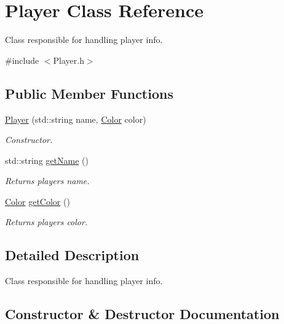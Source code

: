 \hypertarget{classPlayer}{}\section{Player Class Reference}
\label{classPlayer}


Class responsible for handling player info.  




{\ttfamily \#include $<$Player.\+h$>$}

\subsection*{Public Member Functions}
\begin{DoxyCompactItemize}
\item 
\hyperlink{classPlayer_a0e6411e555691354341782b0d6b1bc09}{Player} (std\+::string name, \hyperlink{Enums_8h_ab87bacfdad76e61b9412d7124be44c1c}{Color} color)
\begin{DoxyCompactList}\small\item\em Constructor. \end{DoxyCompactList}\item 
std\+::string \hyperlink{classPlayer_af1aa472885d589516f483e26e786600e}{get\+Name} ()
\begin{DoxyCompactList}\small\item\em Returns players name. \end{DoxyCompactList}\item 
\hyperlink{Enums_8h_ab87bacfdad76e61b9412d7124be44c1c}{Color} \hyperlink{classPlayer_abe2b0f82bdfeda3d872c772da40d5140}{get\+Color} ()
\begin{DoxyCompactList}\small\item\em Returns players color. \end{DoxyCompactList}\end{DoxyCompactItemize}


\subsection{Detailed Description}
Class responsible for handling player info. 

\subsection{Constructor \& Destructor Documentation}
\mbox{\label{classPlayer_a0e6411e555691354341782b0d6b1bc09}} 
